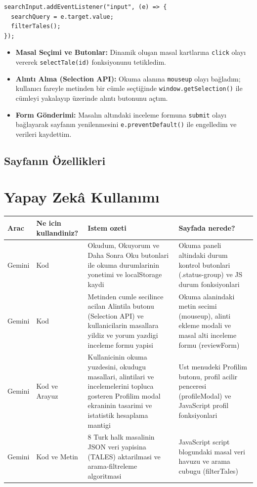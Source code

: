\documentclass[12pt,a4paper]{article}
\begin{document}
\begin{lstlisting}[caption={Olay Dinleyicileri (Event Listeners)}]
searchInput.addEventListener("input", (e) => {
  searchQuery = e.target.value;
  filterTales();
});
\end{lstlisting}

\begin{itemize}
  \item \textbf{Masal Seçimi ve Butonlar:} Dinamik oluşan masal kartlarına \texttt{click} olayı vererek \texttt{selectTale(id)} fonksiyonunu tetikledim.
  \item \textbf{Alıntı Alma (Selection API):} Okuma alanına \texttt{mouseup} olayı bağladım; kullanıcı fareyle metinden bir cümle seçtiğinde \texttt{window.getSelection()} ile cümleyi yakalayıp üzerinde alıntı butonunu açtım.
  \item \textbf{Form Gönderimi:} Masalın altındaki inceleme formuna \texttt{submit} olayı bağlayarak sayfanın yenilenmesini \texttt{e.preventDefault()} ile engelledim ve verileri kaydettim.
\end{itemize}

\subsection{Sayfanın Özellikleri}


\section{Yapay Zekâ Kullanımı}

\begin{longtable}{@{}p{1.8cm}p{2.2cm}p{5.5cm}p{4.5cm}@{}}
\toprule
\textbf{Arac} & \textbf{Ne icin kullandiniz?} & \textbf{Istem ozeti} & \textbf{Sayfada nerede?} \\
\midrule
\endhead

Gemini & Kod & Okudum, Okuyorum ve Daha Sonra Oku butonlari ile okuma durumlarinin yonetimi ve localStorage kaydi & Okuma paneli altindaki durum kontrol butonlari (.status-group) ve JS durum fonksiyonlari \\
\midrule
Gemini & Kod & Metinden cumle secilince acilan Alintila butonu (Selection API) ve kullanicilarin masallara yildiz ve yorum yazdigi inceleme formu yapisi & Okuma alanindaki metin secimi (mouseup), alinti ekleme modali ve masal alti inceleme formu (reviewForm) \\
\midrule
Gemini & Kod ve Arayuz & Kullanicinin okuma yuzdesini, okudugu masallari, alintilari ve incelemelerini topluca gosteren Profilim modal ekraninin tasarimi ve istatistik hesaplama mantigi & Ust menudeki Profilim butonu, profil acilir penceresi (profileModal) ve JavaScript profil fonksiyonlari \\
\midrule
Gemini & Kod ve Metin & 8 Turk halk masalinin JSON veri yapisina (TALES) aktarilmasi ve arama-filtreleme algoritmasi & JavaScript script blogundaki masal veri havuzu ve arama cubugu (filterTales) \\
\bottomrule
\end{longtable}
\end{document}
